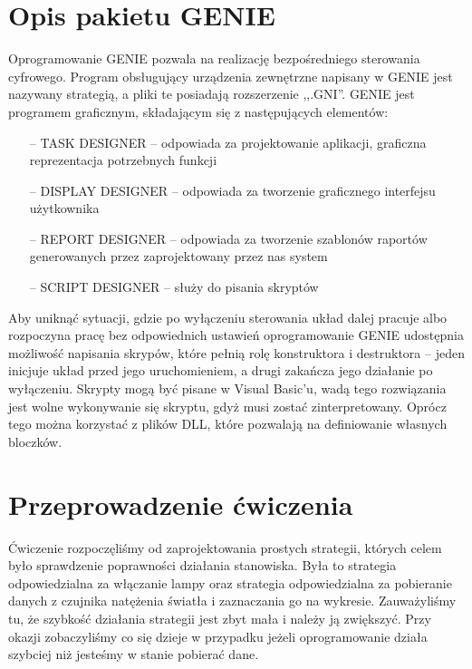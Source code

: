 \documentclass[a4paper, 12pt]{article}
\begin{document}
	\section{Opis pakietu GENIE}
		Oprogramowanie GENIE pozwala na realizację bezpośredniego sterowania cyfrowego. Program obsługujący urządzenia zewnętrzne napisany w GENIE jest nazywany strategią, a pliki te posiadają rozszerzenie ,,.GNI''. GENIE jest programem graficznym, składającym się z następujących elementów:
		\begin{itemize}
			\item[--] TASK DESIGNER -- odpowiada za projektowanie aplikacji, graficzna reprezentacja potrzebnych funkcji
			\item[--] DISPLAY DESIGNER -- odpowiada za tworzenie graficznego interfejsu użytkownika
			\item[--] REPORT DESIGNER -- odpowiada za tworzenie szablonów raportów generowanych przez zaprojektowany przez nas system
			\item[--] SCRIPT DESIGNER -- służy do pisania skryptów
		\end{itemize}
		Aby uniknąć sytuacji, gdzie po wyłączeniu sterowania układ dalej pracuje albo rozpoczyna pracę bez odpowiednich ustawień oprogramowanie GENIE udostępnia możliwość napisania skrypów, które pełnią rolę konstruktora i destruktora -- jeden inicjuje układ przed jego uruchomieniem, \linebreak a drugi zakańcza jego działanie po wyłączeniu. Skrypty mogą być pisane w Visual Basic'u, wadą tego rozwiązania jest wolne wykonywanie się skryptu, gdyż musi zostać zinterpretowany. Oprócz tego można korzystać z plików DLL, które pozwalają na definiowanie własnych bloczków. 
	\section{Przeprowadzenie ćwiczenia}
		Ćwiczenie rozpoczęliśmy od zaprojektowania prostych strategii, których celem było sprawdzenie poprawności działania stanowiska. Była to strategia odpowiedzialna za włączanie lampy oraz strategia odpowiedzialna za pobieranie danych z czujnika natężenia światła i zaznaczania go na wykresie. Zauważyliśmy tu, że szybkość działania strategii jest zbyt mała i należy ją zwiększyć. Przy okazji zobaczyliśmy co się dzieje w przypadku jeżeli oprogramowanie działa szybciej niż jesteśmy w stanie pobierać dane.
\end{document}
